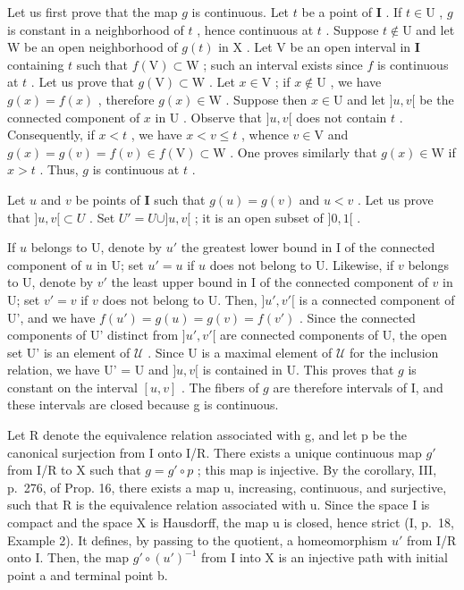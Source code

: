 Let us first prove that the map \(g\) is continuous. Let \(t\) be a point of \(\mathbf{I}\) . If \(t \in \mathrm{U}\) , \(g\) is constant in a neighborhood of \(t\) , hence continuous at \(t\) . Suppose \(t \notin \mathrm{U}\) and let \(\mathrm{W}\) be an open neighborhood of \(g(t)\) in \(\mathrm{X}\) . Let \(\mathrm{V}\) be an open interval in \(\mathbf{I}\) containing \(t\) such that \(f(\mathrm{V}) \subset \mathrm{W}\) ; such an interval exists since \(f\) is continuous at \(t\) . Let us prove that \(g(\mathrm{V}) \subset \mathrm{W}\) . Let \(x \in \mathrm{V}\) ; if \(x \notin \mathrm{U}\) , we have \(g(x) = f(x)\) , therefore \(g(x) \in \mathrm{W}\) . Suppose then \(x \in \mathrm{U}\) and let \(]u, v[\) be the connected component of \(x\) in \(\mathrm{U}\) . Observe that \(]u, v[\) does not contain \(t\) . Consequently, if \(x < t\) , we have \(x < v \leqslant t\) , whence \(v \in \mathrm{V}\) and \(g(x) = g(v) = f(v) \in f(\mathrm{V}) \subset \mathrm{W}\) . One proves similarly that \(g(x) \in \mathrm{W}\) if \(x > t\) . Thus, \(g\) is continuous at \(t\) .

Let \(u\) and \(v\) be points of \(\mathbf{I}\) such that \(g(u) = g(v)\) and \(u < v\) . Let us prove that \(]u, v[ \subset U\) . Set \(U' = U \cup ]u, v[\) ; it is an open subset of \(]0, 1[\) .

If \(u\) belongs to U, denote by \(u'\) the greatest lower bound in I of the connected component of \(u\) in U; set \(u' = u\) if \(u\) does not belong to U. Likewise, if \(v\) belongs to U, denote by \(v'\) the least upper bound in I of the connected component of \(v\) in U; set \(v' = v\) if \(v\) does not belong to U. Then, \(]u', v'[\) is a connected component of U', and we have \(f(u') = g(u) = g(v) = f(v')\) . Since the connected components of U' distinct from \(]u', v'[\) are connected components of U, the open set U' is an element of \(\mathcal{U}\) . Since U is a maximal element of \(\mathcal{U}\) for the inclusion relation, we have U' = U and \(]u, v[\) is contained in U. This proves that \(g\) is constant on the interval \([u, v]\) . The fibers of \(g\) are therefore intervals of I, and these intervals are closed because g is continuous.

Let R denote the equivalence relation associated with g, and let p be the canonical surjection from I onto I/R. There exists a unique continuous map \(g'\) from I/R to X such that \(g = g' \circ p\) ; this map is injective. By the corollary, III, p.~276, of Prop. 16, there exists a map u, increasing, continuous, and surjective, such that R is the equivalence relation associated with u. Since the space I is compact and the space X is Hausdorff, the map u is closed, hence strict (I, p.~18, Example 2). It defines, by passing to the quotient, a homeomorphism \(u'\) from I/R onto I. Then, the map \(g' \circ (u')^{-1}\) from I into X is an injective path with initial point a and terminal point b.

